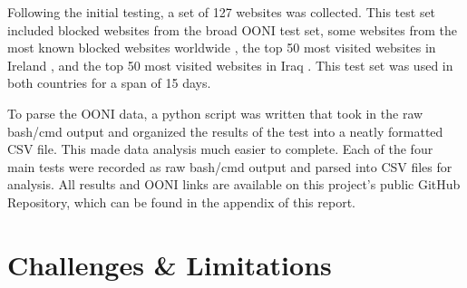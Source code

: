 Following the initial testing, a set of 127 websites was collected. This test set included blocked websites from the broad OONI test set, some websites from the most known blocked websites worldwide \cite{blocksiteMostBlocked}, the top 50 most visited websites in Ireland \cite{top50irishwebsites}, and the top 50 most visited websites in Iraq \cite{top50IraqWebsites}. This test set was used in both countries for a span of 15 days.

To parse the OONI data, a python script was written that took in the raw bash/cmd output and organized the results of the test into a neatly formatted CSV file. This made data analysis much easier to complete. Each of the four main tests were recorded as raw bash/cmd output and parsed into CSV files for analysis. All results and OONI links are available on this project's public GitHub Repository, which can be found in the appendix of this report.

\section{Challenges \& Limitations}


